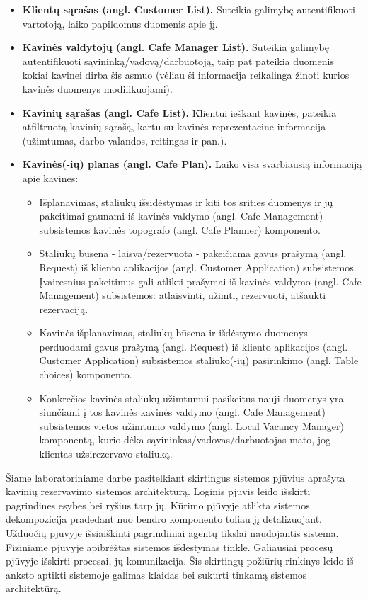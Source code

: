 \documentclass{VUMIFPSkursinis}
\begin{document}
\begin{itemize}
  \item \textbf{Klientų sąrašas (angl. Customer List).} Suteikia galimybę autentifikuoti vartotoją, laiko papildomus duomenis apie jį.
  \item \textbf{Kavinės valdytojų (angl. Cafe Manager List).} Suteikia galimybę autentifikuoti sąvininką/vadovą/darbuotoją, taip pat pateikia duomenis kokiai kavinei dirba šis asmuo (vėliau ši informacija reikalinga žinoti kurios kavinės duomenys modifikuojami).
  \item \textbf{Kavinių sąrašas (angl. Cafe List).} Klientui ieškant kavinės, pateikia atfiltruotą kavinių sąrašą, kartu su kavinės reprezentacine informacija (užimtumas, darbo valandos, reitingas ir pan.).
  \item \textbf{Kavinės(-ių) planas (angl. Cafe Plan).} Laiko visa svarbiausią informaciją apie kavines:
  	\begin{itemize}
  	\item Išplanavimas, staliukų išsidėstymas ir kiti tos srities duomenys ir jų pakeitimai gaunami iš kavinės valdymo (angl. Cafe Management) subsistemos kavinės topografo (angl. Cafe Planner) komponento.
  	\item Staliukų būsena - laisva/rezervuota - pakeičiama gavus prašymą (angl. Request) iš kliento aplikacijos (angl. Customer Application) subsistemos. Įvairesnius pakeitimus gali atlikti prašymai iš kavinės valdymo (angl. Cafe Management) subsistemos: atlaisvinti, užimti, rezervuoti, atšaukti rezervaciją.
  	\item Kavinės išplanavimas, staliukų būsena ir išdėstymo duomenys perduodami gavus prašymą (angl. Request) iš kliento aplikacijos (angl. Customer Application) subsistemos staliuko(-ių) pasirinkimo (angl. Table choices) komponento.
  	\item Konkrečios kavinės staliukų užimtumui pasikeitus nauji duomenys yra siunčiami į tos kavinės kavinės valdymo (angl. Cafe Management) subsistemos vietos užimtumo valdymo (angl. Local Vacancy Manager) komponentą, kurio dėka sąvininkas/vadovas/darbuotojas mato, jog klientas užsirezervavo staliuką.
  	\end{itemize}
\end{itemize}




Šiame laboratoriniame darbe pasitelkiant skirtingus sistemos pjūvius aprašyta kavinių rezervavimo sistemos architektūrą. Loginis pjūvis leido išskirti pagrindines esybes bei ryšius tarp jų. Kūrimo pjūvyje atlikta sistemos dekompozicija pradedant nuo bendro komponento toliau jį detalizuojant. Užduočių pjūvyje išsiaiškinti pagrindiniai agentų tikslai naudojantis sistema. Fiziniame pjūvyje apibrėžtas sistemos išdėstymas tinkle.  Galiausiai procesų pjūvyje išskirti procesai, jų komunikacija. Šis skirtingų požiūrių rinkinys leido iš anksto aptikti sistemoje galimas klaidas bei sukurti tinkamą sistemos architektūrą.
\end{document}
